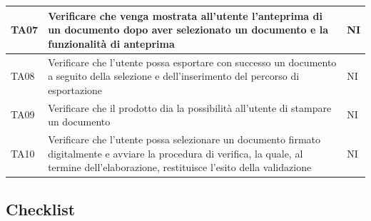 \documentclass[a4paper,12pt]{article}
\begin{document}
\begin{longtable}{|M{1.5cm}|M{8.5cm}|M{2cm}|}
                TA07 & Verificare che venga mostrata all’utente l’anteprima di un documento dopo aver selezionato un documento e la funzionalità di anteprima & NI \\
                \hline
                
                TA08 & Verificare che l’utente possa esportare con successo un documento a seguito della selezione e dell’inserimento del percorso di esportazione & NI \\
                \hline

                TA09 & Verificare che il prodotto dia la possibilità all’utente di stampare un documento & NI \\
                \hline

                TA10 & Verificare che l’utente possa selezionare un documento firmato digitalmente e avviare la procedura di verifica, la quale, al termine dell’elaborazione, restituisce l’esito della validazione & NI \\
                \hline

        \end{longtable}

        


        \subsection{Checklist}
\end{document}
